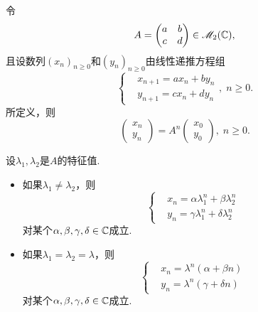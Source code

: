 \begin{theorem}
  令
  \[
    A = \begin{pmatrix}
      a & b \\
      c & d
    \end{pmatrix} \in \mathscr M_2(\mathbb C),
  \]
  且设数列$(x_n)_{n\ge0}$和$(y_n)_{n\ge0}$由线性递推方程组
  \begin{equation}\label{eq3.2}
    \left\{
      \begin{aligned}
        & x_{n+1} = ax_n + by_n \\
        & y_{n+1} = cx_n + dy_n
      \end{aligned}
    \right.,\; n\ge0.
  \end{equation}
  所定义，则
  \[
    \begin{pmatrix}
      x_n \\ y_n
    \end{pmatrix} = A^n\begin{pmatrix}
      x_0 \\ y_0
    \end{pmatrix},\; n\ge0.
  \]

  设$\lambda_1,\lambda_2$是$A$的特征值.
  \begin{itemize}
    \item 如果$\lambda_1\ne\lambda_2$，则
    \[
      \left\{
        \begin{aligned}
          & x_n = \alpha\lambda_1^n + \beta\lambda_2^n \\
          & y_n = \gamma\lambda_1^n + \delta\lambda_2^n
        \end{aligned}
      \right.
    \]
    对某个$\alpha,\beta,\gamma,\delta\in\mathbb C$成立.
    \item 如果$\lambda_1=\lambda_2=\lambda$，则
    \[
      \left\{
        \begin{aligned}
          & x_n = \lambda^n(\alpha + \beta n) \\
          & y_n = \lambda^n(\gamma + \delta n)
        \end{aligned}
      \right.
    \]
    对某个$\alpha,\beta,\gamma,\delta\in\mathbb C$成立.
  \end{itemize}
\end{theorem}

